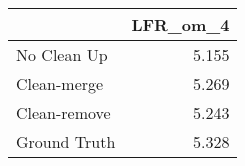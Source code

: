 \begin{tabular}{lr}
\toprule
{} & LFR_om_4 \\
\midrule
No Clean Up  &    5.155 \\
Clean-merge  &    5.269 \\
Clean-remove &    5.243 \\
Ground Truth &    5.328 \\
\bottomrule
\end{tabular}
